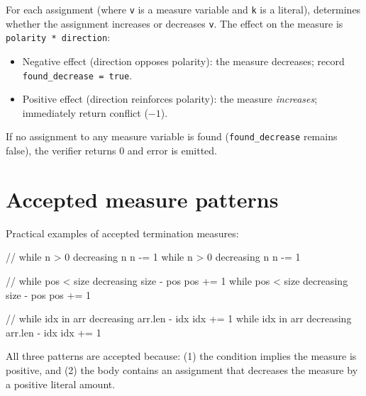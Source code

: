 \pnum
For each assignment  (where \texttt{v} is a measure variable
and \texttt{k} is a literal),  determines whether
the assignment increases or decreases \texttt{v}.  The effect on the measure is
\texttt{polarity * direction}:
\begin{itemize}
\item Negative effect (direction opposes polarity): the measure decreases; record
  \texttt{found\_decrease = true}.
\item Positive effect (direction reinforces polarity): the measure \emph{increases};
  immediately return conflict ($-1$).
\end{itemize}

\pnum
If no assignment to any measure variable is found (\texttt{found\_decrease} remains
false), the verifier returns 0 and error  is emitted.

\section{Accepted measure patterns}
\label{sec:term-patterns}

\pnum
Practical examples of accepted termination measures:

\begin{laincode}
// while n > 0 decreasing n { n -= 1 }
while n > 0 decreasing n {
    n -= 1
}

// while pos < size decreasing size - pos { pos += 1 }
while pos < size decreasing size - pos {
    pos += 1
}

// while idx in arr decreasing arr.len - idx { idx += 1 }
while idx in arr decreasing arr.len - idx {
    idx += 1
}
\end{laincode}

\pnum
All three patterns are accepted because: (1) the condition implies the measure is
positive, and (2) the body contains an assignment that decreases the measure by a
positive literal amount.
